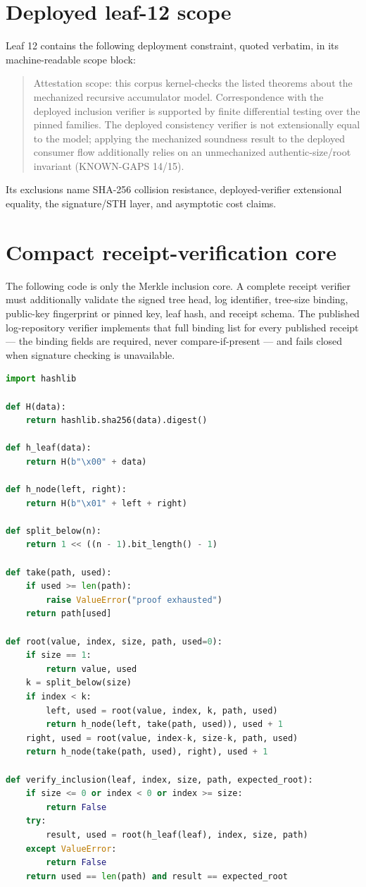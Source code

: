 \documentclass[11pt]{article}
\theoremstyle{remark}
\begin{document}
\section{Deployed leaf-12 scope}\label{app:entry13}
Leaf 12 contains the following deployment constraint,
quoted verbatim, in its machine-readable scope block:
\begin{quote}\small
Attestation scope: this corpus kernel-checks the listed theorems about the
mechanized recursive accumulator model. Correspondence with the deployed
inclusion verifier is supported by finite differential testing over the pinned
families. The deployed consistency verifier is not extensionally equal to the
model; applying the mechanized soundness result to the deployed consumer flow
additionally relies on an unmechanized authentic-size/root invariant
(KNOWN-GAPS 14/15).
\end{quote}
Its exclusions name SHA-256 collision resistance, deployed-verifier extensional
equality, the signature/STH layer, and asymptotic cost claims.

\section{Compact receipt-verification core}\label{app:verifier}
The following code is only the Merkle inclusion core. A complete receipt
verifier must additionally validate the signed tree head, log identifier,
tree-size binding, public-key fingerprint or pinned key, leaf hash, and receipt
schema. The published log-repository verifier implements that full binding
list for every published receipt --- the binding fields are required, never
compare-if-present --- and fails closed when signature checking is
unavailable.
\begin{lstlisting}[language=Python]
import hashlib

def H(data):
    return hashlib.sha256(data).digest()

def h_leaf(data):
    return H(b"\x00" + data)

def h_node(left, right):
    return H(b"\x01" + left + right)

def split_below(n):
    return 1 << ((n - 1).bit_length() - 1)

def take(path, used):
    if used >= len(path):
        raise ValueError("proof exhausted")
    return path[used]

def root(value, index, size, path, used=0):
    if size == 1:
        return value, used
    k = split_below(size)
    if index < k:
        left, used = root(value, index, k, path, used)
        return h_node(left, take(path, used)), used + 1
    right, used = root(value, index-k, size-k, path, used)
    return h_node(take(path, used), right), used + 1

def verify_inclusion(leaf, index, size, path, expected_root):
    if size <= 0 or index < 0 or index >= size:
        return False
    try:
        result, used = root(h_leaf(leaf), index, size, path)
    except ValueError:
        return False
    return used == len(path) and result == expected_root
\end{lstlisting}
\end{document}
